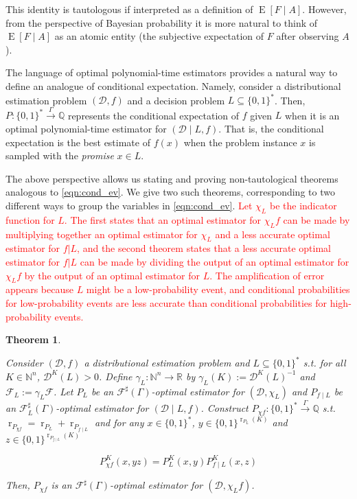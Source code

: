 \documentclass[11pt]{article}
\numberwithin{equation}{section}
\theoremstyle{definition}
\theoremstyle{plain}
\newtheorem{theorem}{Theorem}[section]
\newcommand{\Bool}{\{0,1\}}
\newcommand{\Words}{{\Bool^*}}
\DeclareMathOperator{\E}{E}
\DeclareMathOperator{\R}{r}
\newcommand{\Nats}{\mathbb{N}}
\newcommand{\Rats}{\mathbb{Q}}
\newcommand{\Reals}{\mathbb{R}}
\newcommand{\NatFun}{\Nats^n \rightarrow}
\newcommand{\Dist}{\mathcal{D}}
\newcommand{\Fall}{\mathcal{F}}
\newcommand{\ESG}{\Fall^\sharp(\Gamma)}
\newcommand{\BoolR}[1]{\Bool^{\R_{#1}(K)}}
\newcommand{\Scheme}{\xrightarrow{\Gamma}}
\begin{document}
This identity is tautologous if interpreted as a definition of $\E[F \mid A]$. However, from the perspective of Bayesian probability it is more natural to think of $\E[F \mid A]$ as an atomic entity (the subjective expectation of $F$ after observing $A$). 

The language of optimal polynomial-time estimators provides a natural way to define an analogue of conditional expectation. Namely, consider a distributional estimation problem $(\Dist, f)$ and a decision problem ${L \subseteq \Words}$. Then, $P: \Words \Scheme \Rats$ represents the conditional expectation of $f$ given $L$ when it is an optimal polynomial-time estimator for $(\Dist \mid L, f)$. That is, the conditional expectation is the best estimate of $f(x)$ when the problem instance $x$ is sampled with the \emph{promise} $x \in L$.

The above perspective allows us stating and proving non-tautological theorems analogous to \ref{eqn:cond_ev}. We give two such theorems, corresponding to two different ways to group the variables in \ref{eqn:cond_ev}. \textcolor{red}{Let $\chi_{L}$ be the indicator function for $L$. The first states that an optimal estimator for $\chi_{L}f$ can be made by multiplying together an optimal estimator for $\chi_{L}$ and a less accurate optimal estimator for $f|L$, and the second theorem states that a less accurate optimal estimator for $f|L$ can be made by dividing the output of an optimal estimator for $\chi_{L}f$ by the output of an optimal estimator for $L$. The amplification of error appears because $L$ might be a low-probability event, and conditional probabilities for low-probability events are less accurate than conditional probabilities for high-probability events.}

\begin{samepage}
\begin{theorem}
\label{thm:con_cond}

Consider $(\Dist, f)$ a distributional estimation problem and ${L \subseteq \Words}$ s.t. for all $K \in \Nats^n$, $\Dist^K(L) > 0$. Define $\gamma_L: \NatFun \Reals$ by $\gamma_L(K):=\Dist^{K}(L)^{-1}$ and $\Fall_L:=\gamma_L \Fall$. Let $P_L$ be an $\ESG$-optimal estimator for $(\Dist, \chi_L)$ and $P_{f \mid L}$ be an $\Fall_L^\sharp(\Gamma)$-optimal estimator for ${(\Dist \mid L, f)}$. Construct ${P_{\chi f}: \Words \Scheme \Rats}$ s.t. $\R_{P_{\chi f}}=\R_{P_L} + \R_{P_{f \mid L}}$ and for any ${x \in \Words}$, $y \in \BoolR{P_L}$ and ${z \in \BoolR{P_{f \mid L}}}$

\begin{equation}
P_{\chi f}^K(x,yz)=P_L^K(x,y) P_{f \mid L}^K(x,z)
\end{equation}

Then, $P_{\chi f}$ is an $\ESG$-optimal estimator for $(\Dist, \chi_L f)$.

\end{theorem}
\end{samepage}
\end{document}

